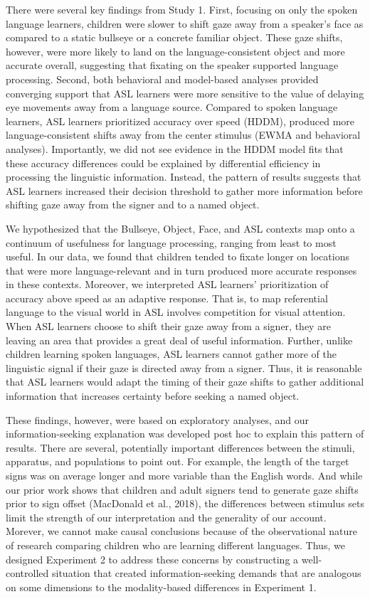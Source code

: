 \documentclass[,man,floatsintext]{apa6}
\begin{document}
There were several key findings from Study 1. First, focusing on only the spoken language learners, children were slower to shift gaze away from a speaker's face as compared to a static bullseye or a concrete familiar object. These gaze shifts, however, were more likely to land on the language-consistent object and more accurate overall, suggesting that fixating on the speaker supported language processing. Second, both behavioral and model-based analyses provided converging support that ASL learners were more sensitive to the value of delaying eye movements away from a language source. Compared to spoken language learners, ASL learners prioritized accuracy over speed (HDDM), produced more language-consistent shifts away from the center stimulus (EWMA and behavioral analyses). Importantly, we did not see evidence in the HDDM model fits that these accuracy differences could be explained by differential efficiency in processing the linguistic information. Instead, the pattern of results suggests that ASL learners increased their decision threshold to gather more information before shifting gaze away from the signer and to a named object.

We hypothesized that the Bullseye, Object, Face, and ASL contexts map onto a continuum of usefulness for language processing, ranging from least to most useful. In our data, we found that children tended to fixate longer on locations that were more language-relevant and in turn produced more accurate responses in these contexts. Moreover, we interpreted ASL learners' prioritization of accuracy above speed as an adaptive response. That is, to map referential language to the visual world in ASL involves competition for visual attention. When ASL learners choose to shift their gaze away from a signer, they are leaving an area that provides a great deal of useful information. Further, unlike children learning spoken languages, ASL learners cannot gather more of the linguistic signal if their gaze is directed away from a signer. Thus, it is reasonable that ASL learners would adapt the timing of their gaze shifts to gather additional information that increases certainty before seeking a named object.

These findings, however, were based on exploratory analyses, and our information-seeking explanation was developed post hoc to explain this pattern of results. There are several, potentially important differences between the stimuli, apparatus, and populations to point out. For example, the length of the target signs was on average longer and more variable than the English words. And while our prior work shows that children and adult signers tend to generate gaze shifts prior to sign offset (MacDonald et al., 2018), the differences between stimulus sets limit the strength of our interpretation and the generality of our account. Morever, we cannot make causal conclusions because of the observational nature of research comparing children who are learning different languages. Thus, we designed Experiment 2 to address these concerns by constructing a well-controlled situation that created information-seeking demands that are analogous on some dimensions to the modality-based differences in Experiment 1.
\end{document}
